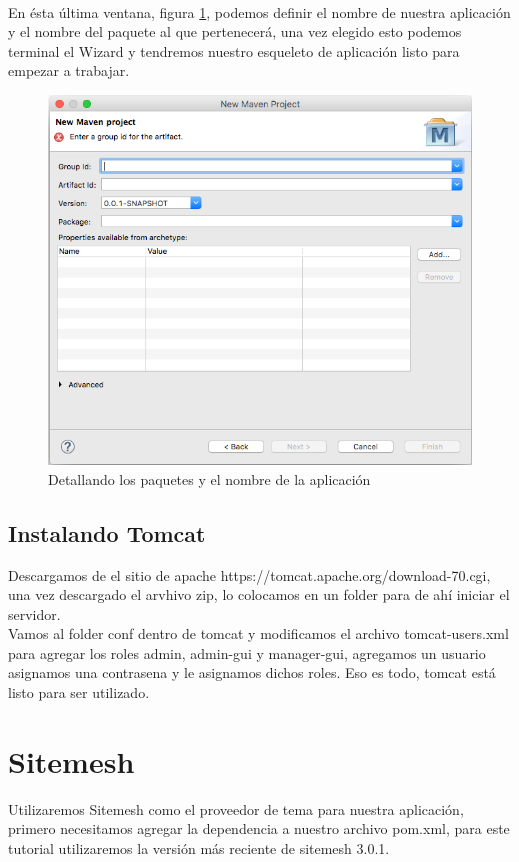\documentclass[12pt]{article}
\begin{document}
        \\
        En \'esta \'ultima ventana, figura \ref{04_nuevo_proyecto}, podemos definir el nombre de nuestra aplicaci\'on y el nombre del paquete al que pertenecer\'a, una vez elegido esto podemos terminal el Wizard y tendremos nuestro esqueleto de aplicaci\'on listo para empezar a trabajar.
        \begin{figure}[h]
            \centering
            \includegraphics[scale=0.4]{04_nuevo_proyecto}
            \caption{Detallando los paquetes y el nombre de la aplicaci\'on}
            \label{04_nuevo_proyecto}
        \end{figure}
        \newpage
        
		\subsection{Instalando Tomcat}
		Descargamos de el sitio de apache https://tomcat.apache.org/download-70.cgi, una vez descargado el arvhivo zip, lo colocamos en un folder para de ah\'i iniciar el servidor.\\
		Vamos al folder conf dentro de tomcat y modificamos el archivo tomcat-users.xml para agregar los roles admin, admin-gui y manager-gui, agregamos un usuario asignamos una contrasena y le asignamos dichos roles. Eso es todo, tomcat est\'a listo para ser utilizado.
		\newpage

    \section{Sitemesh}
		Utilizaremos Sitemesh como el proveedor de tema para nuestra aplicaci\'on, primero necesitamos agregar la dependencia a nuestro archivo pom.xml, para este tutorial utilizaremos la versi\'on m\'as reciente de sitemesh 3.0.1.\\
\end{document}
